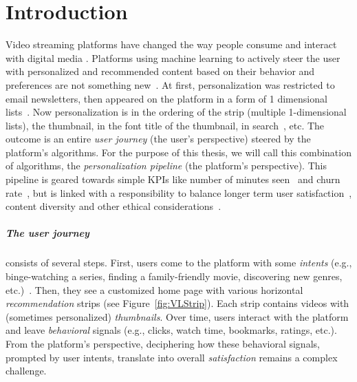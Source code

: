 
\chapter{Introduction}
\label{chapter:introduction}


Video streaming platforms have changed the way people consume and interact with digital media \cite{NetflixReco}. Platforms using machine learning to actively steer the user with personalized and recommended content based on their behavior and preferences are not something new~\cite{oldPersonalizationBehavior, oldPersonalizationSearch}. At first, personalization was restricted to email newsletters, then appeared on the platform in a form of 1 dimensional lists~\cite{oldReco}. Now personalization is in the ordering of the strip (multiple 1-dimensional lists), the thumbnail, in the font title of the thumbnail, in search~\cite{NetflixReco}, etc. The outcome is an entire \emph{user journey} (the user's perspective) steered by the platform's algorithms. For the purpose of this thesis, we will call this combination of algorithms, the \emph{personalization pipeline} (the platform's perspective). This pipeline is geared towards simple KPIs like number of minutes seen~\cite{spotifyIntent} and churn rate~\cite{oldChurn}, but is linked with a responsibility to balance longer term user satisfaction~\cite{longTerm}, content diversity and other ethical considerations~\cite{helberger}.

\paragraph{The user journey} consists of several steps. First, users come to the platform with some \emph{intents} (e.g., binge-watching a series, finding a family-friendly movie, discovering new genres, etc.)~\cite{intent}. Then, they see a customized home page with various horizontal \emph{recommendation} strips (see Figure~\ref{fig:VLStrip}). Each strip contains videos with (sometimes personalized) \emph{thumbnails}. Over time, users interact with the platform and leave \emph{behavioral} signals (e.g., clicks, watch time, bookmarks, ratings, etc.). From the platform's perspective, deciphering how these behavioral signals, prompted by user intents, translate into overall \emph{satisfaction} remains a complex challenge. 

